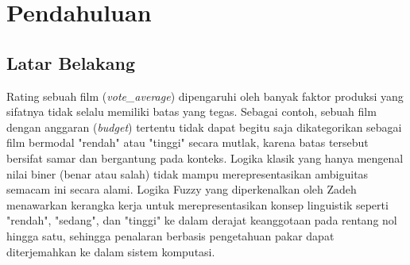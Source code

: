 \documentclass[11pt,a4paper]{article}
\begin{document}
\begin{abstract}
Laporan ini membahas pengembangan dan evaluasi sistem prediksi rating film (\textit{vote\_average}) menggunakan Sistem Inferensi Fuzzy (\textit{Fuzzy Inference System}, FIS) metode Mamdani dan Sugeno yang dibangun secara \textit{from scratch} dengan lima variabel input, yaitu \textit{budget}, \textit{popularity}, \textit{runtime}, \textit{vote\_count}, dan \textit{release\_year}. Dataset yang digunakan berasal dari The Movies Dataset (TMDb) yang setelah proses pembersihan menyisakan 8.094 baris data bersih. Sistem dibangun dengan 27 \textit{rule base} menggunakan operator MIN untuk implikasi dan operator MAX untuk agregasi, dengan defuzzifikasi Centroid untuk Mamdani dan Weighted Average untuk Sugeno. Untuk mengatasi keterbatasan akurasi sistem berbasis aturan manual, derajat keanggotaan fuzzy dan hasil inferensi FIS diekstrak menjadi vektor fitur fuzzy berdimensi 17 dan diintegrasikan ke dalam beberapa model Machine Learning (\textit{Linear Regression, Random Forest, Support Vector Regression}) serta model Deep Learning berupa \textit{Multi-Layer Perceptron} (MLP) yang juga dibangun \textit{from scratch} menggunakan NumPy. Seluruh sistem kemudian diimplementasikan ke dalam dashboard web interaktif berbasis Streamlit yang memungkinkan pengguna membandingkan prediksi seluruh model secara real-time. Hasil pengujian menunjukkan bahwa Sugeno secara konsisten lebih unggul dibandingkan Mamdani baik dari segi akurasi prediksi maupun kompleksitas waktu komputasi, sedangkan model Random Forest berbasis fitur fuzzy menghasilkan performa prediksi terbaik secara keseluruhan pada simulasi batch dashboard.

\vspace{0.3cm}
\noindent \textbf{Kata Kunci:} Logika Fuzzy, Mamdani, Sugeno, Random Forest, Multi-Layer Perceptron, Streamlit, Prediksi Rating Film.
\end{abstract}

\newpage

\section{Pendahuluan}
\subsection{Latar Belakang}
Rating sebuah film (\textit{vote\_average}) dipengaruhi oleh banyak faktor produksi yang sifatnya tidak selalu memiliki batas yang tegas. Sebagai contoh, sebuah film dengan anggaran (\textit{budget}) tertentu tidak dapat begitu saja dikategorikan sebagai film bermodal "rendah" atau "tinggi" secara mutlak, karena batas tersebut bersifat samar dan bergantung pada konteks. Logika klasik yang hanya mengenal nilai biner (benar atau salah) tidak mampu merepresentasikan ambiguitas semacam ini secara alami. Logika Fuzzy yang diperkenalkan oleh Zadeh menawarkan kerangka kerja untuk merepresentasikan konsep linguistik seperti "rendah", "sedang", dan "tinggi" ke dalam derajat keanggotaan pada rentang nol hingga satu, sehingga penalaran berbasis pengetahuan pakar dapat diterjemahkan ke dalam sistem komputasi.
\end{document}
